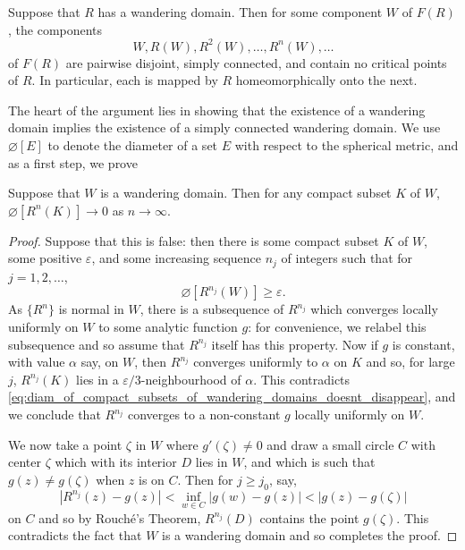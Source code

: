 \begin{lemma}
    \label{lem:properties_of_wandering_domains_of_R}
    Suppose that $R$ has a wandering domain. Then for some component $W$ of
    $F(R)$, the components
    \begin{equation}
        \label{eq:Fatou_wandering_component_iterates}
        W, R(W), R^2(W), \dots, R^n(W), \dots
    \end{equation}
    of $F(R)$ are pairwise disjoint, simply connected, and contain no critical
    points of $R$. In particular, each is mapped by $R$ homeomorphically onto
    the next.
\end{lemma}

The heart of the argument lies in showing that the existence of a wandering
domain implies the existence of a simply connected wandering domain. We use
$\diameter[E]$ to denote the diameter of a set $E$ with respect to the spherical
metric, and as a first step, we prove

\begin{lemma}
    \label{lem:compact_subsets_of_wandering_domains_disappear}
    Suppose that $W$ is a wandering domain. Then for any compact subset $K$ of
    $W$, $\diameter[R^n(K)] \to 0$ as $n \to \infty$.
\end{lemma}
\begin{proof}
    Suppose that this is false: then there is some compact subset $K$ of $W$,
    some positive $\varepsilon$, and some increasing sequence $n_j$ of integers
    such that for $j = 1, 2, \dots$,
    \begin{equation}
        \label{eq:diam_of_compact_subsets_of_wandering_domains_doesnt_disappear}
        \diameter[R^{n_j}(W)] \geq \varepsilon.
    \end{equation}
    As $\{R^n\}$ is normal in $W$, there is a subsequence of $R^{n_j}$ which
    converges locally uniformly on $W$ to some analytic function $g$: for
    convenience, we relabel this subsequence and so assume that $R^{n_j}$ itself
    has this property. Now if $g$ is constant, with value $\alpha$ say, on $W$,
    then $R^{n_j}$ converges uniformly to $\alpha$ on $K$ and so, for large $j$,
    $R^{n_j}(K)$ lies in a $\varepsilon/3$-neighbourhood of $\alpha$. This
    contradicts
    \eqref{eq:diam_of_compact_subsets_of_wandering_domains_doesnt_disappear},
    and we conclude that $R^{n_j}$ converges to a non-constant $g$ locally
    uniformly on $W$.

    We now take a point $\zeta$ in $W$ where $g'(\zeta) \neq 0$ and draw a small
    circle $C$ with center $\zeta$ which with its interior $D$ lies in $W$, and
    which is such that $g(z) \neq g(\zeta)$ when $z$ is on $C$. Then for $j \geq
    j_0$, say,
    \begin{equation*}
        |R^{n_j}(z) - g(z)| < \inf_{w \in C} |g(w) - g(z)| < |g(z) - g(\zeta)|
    \end{equation*}
    on $C$ and so by Rouché's Theorem, $R^{n_j}(D)$ contains the point
    $g(\zeta)$. This contradicts the fact that $W$ is a wandering domain and so
    completes the proof.
\end{proof}

